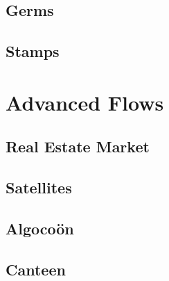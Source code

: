 \documentclass[10pt,a4paper,twoside]{report}
\begin{document}
\newpage
\subsection*{Germs}
\begin{keywords}\end{keywords}


\newpage
\subsection*{Stamps}
\begin{keywords}\end{keywords}



\newpage
\section{Advanced Flows}

\subsection*{Real Estate Market}
\begin{keywords}\end{keywords}


\newpage
\subsection*{Satellites}
\begin{keywords}\end{keywords}


\newpage
\subsection*{Algoco\"on}
\begin{keywords}\end{keywords}


\newpage
\subsection*{Canteen}
\begin{keywords}\end{keywords}

\end{document}
